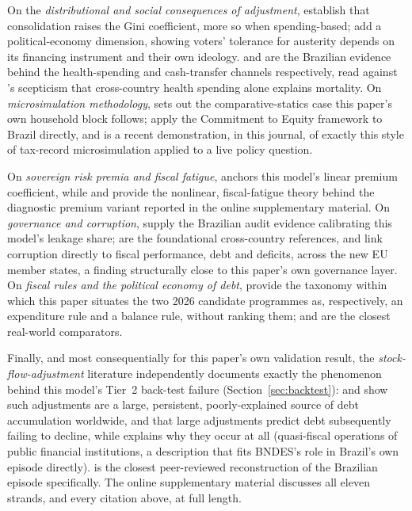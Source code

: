 \documentclass[11pt,a4paper]{article}
\begin{document}
On the \emph{distributional and social consequences of adjustment}, \citet{ballfurcerilleighlloungani2013,woobovakindazhang2017} establish that consolidation raises the Gini coefficient, more so when spending-based; \citet{lagopenasetal2024} add a political-economy dimension, showing voters' tolerance for austerity depends on its financing instrument and their own ideology. \citet{szkloclarkerocha2024} and \citet{rasellaetal2013} are the Brazilian evidence behind the health-spending and cash-transfer channels respectively, read against \citet{filmerpritchett1999}'s scepticism that cross-country health spending alone explains mortality. On \emph{microsimulation methodology}, \citet{bourguignonspadaro2006} sets out the comparative-statics case this paper's own household block follows; \citet{higginspereira2014} apply the Commitment to Equity framework to Brazil directly, and \citet{balladaresgarciamiralles2026} is a recent demonstration, in this journal, of exactly this style of tax-record microsimulation applied to a live policy question.

On \emph{sovereign risk premia and fiscal fatigue}, \citet{baldaccikumar2010} anchors this model's linear premium coefficient, while \citet{ghoshkimmendozaostryqureshi2013} and \citet{bi2012} provide the nonlinear, fiscal-fatigue theory behind the diagnostic premium variant reported in the online supplementary material. On \emph{governance and corruption}, \citet{ferrazfinanmoreira2012,avisferrazfinan2018} supply the Brazilian audit evidence calibrating this model's leakage share; \citet{mauro1995,olken2007} are the foundational cross-country references, and \citet{hanousekkocenda2011} link corruption directly to fiscal performance, debt and deficits, across the new EU member states, a finding structurally close to this paper's own governance layer. On \emph{fiscal rules and the political economy of debt}, \citet{kopitssymansky1998} provide the taxonomy within which this paper situates the two 2026 candidate programmes as, respectively, an expenditure rule and a balance rule, without ranking them; \citet{feldkirchgassner2008} and \citet{lopezvillavicencio2025} are the closest real-world comparators.

Finally, and most consequentially for this paper's own validation result, the \emph{stock-flow-adjustment} literature independently documents exactly the phenomenon behind this model's Tier~2 back-test failure (Section~\ref{sec:backtest}): \citet{weber2012sfa} and \citet{jaramilloetal2017} show such adjustments are a large, persistent, poorly-explained source of debt accumulation worldwide, and that large adjustments predict debt subsequently failing to decline, while \citet{mackenziestella1996} explains why they occur at all (quasi-fiscal operations of public financial institutions, a description that fits BNDES's role in Brazil's own episode directly). \citet{gobettiorair2017} is the closest peer-reviewed reconstruction of the Brazilian episode specifically. The online supplementary material discusses all eleven strands, and every citation above, at full length.
\end{document}
